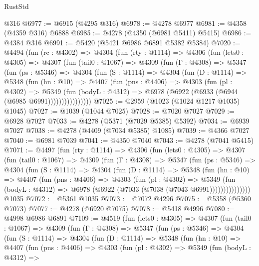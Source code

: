 \begin{lexlean}{RustStd}
\begin{coremodule}
{\begin{coremodule}
{{{{{{{{{{{{{{{{{{{{{{{{{{{{{{{{{{{    @316
@6977 := @6915 (@4295 @316)
@6978 := @4278 @6977
@6981 := @4358 (@4359 @316) @6888
@6985 := @4278 (@4350 (@6981 @5411) @5415)
@6986 := @4384 @316
@6991 := @5420 (@5421 @6986 @6891 @5382 @5384)
@7020 := @4494
    (fun (rc : @4302) =>
    @4304
      (fun (rty : @1114) =>
      @4306
        (fun (lets0 : @4305) =>
        @4307
          (fun (tail0 : @1067) =>
          @4309
            (fun (Γ : @4308) =>
            @5347
              (fun (ps : @5346) =>
              @4304
                (fun (S : @1114) =>
                @4304
                  (fun (D : @1114) =>
                  @5348
                    (fun (hn : @10) =>
                    @4407
                      (fun (pns : @4406) =>
                      @4303
                        (fun (pl : @4302) =>
                        @5349
                          (fun (bodyL : @4312) =>
                          @6978 (@6922 (@6933 (@6944 (@6985 @6991))))))))))))))))
@7025 := @2959 (@1023 (@1024 @1217 @1035) @1045)
@7027 := @1039 (@1044 @7025)
@7028 := @7020 @7027
@7029 := @6928 @7027
@7033 := @4278 (@5371 (@7029 @5385) @5392)
@7034 := @6939 @7027
@7038 := @4278 (@4409 (@7034 @5385) @1085)
@7039 := @4366 @7027
@7040 := @6981 @7039
@7041 := @4350 @7040
@7043 := @4278 (@7041 @5415)
@7071 := @4497
    (fun (rty : @1114) =>
    @4306
      (fun (lets0 : @4305) =>
      @4307
        (fun (tail0 : @1067) =>
        @4309
          (fun (Γ : @4308) =>
          @5347
            (fun (ps : @5346) =>
            @4304
              (fun (S : @1114) =>
              @4304
                (fun (D : @1114) =>
                @5348
                  (fun (hn : @10) =>
                  @4407
                    (fun (pns : @4406) =>
                    @4303
                      (fun (pl : @4302) =>
                      @5349
                        (fun (bodyL : @4312) =>
                        @6978 (@6922 (@7033 (@7038 (@7043 @6991)))))))))))))))
    @1035
@7072 := @5361 @1035
@7073 := @7072 @4296
@7075 := @5358 (@5360 @7073)
@7077 := @4278 (@6920 @7075)
@7078 := @5418 @4996
@7080 := @4998 @6986 @6891
@7109 := @4519
    (fun (lets0 : @4305) =>
    @4307
      (fun (tail0 : @1067) =>
      @4309
        (fun (Γ : @4308) =>
        @5347
          (fun (ps : @5346) =>
          @4304
            (fun (S : @1114) =>
            @4304
              (fun (D : @1114) =>
              @5348
                (fun (hn : @10) =>
                @4407
                  (fun (pns : @4406) =>
                  @4303
                    (fun (pl : @4302) =>
                    @5349
                      (fun (bodyL : @4312) =>
}}}}}}}}}}}}}}}}}}}}}}}}}}}}}}}}}}}
\end{coremodule}}
\end{coremodule}
\end{lexlean}
